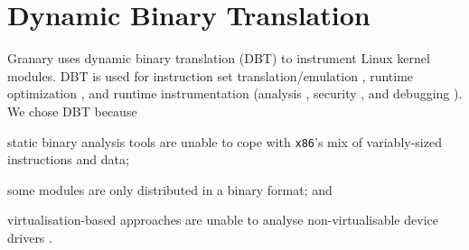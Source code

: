 \documentclass[preprint]{sigplanconf}
\newcommand{\comment}[1]{}
\begin{document}
%	

\section{Dynamic Binary Translation}\label{sec:dbt}


Granary uses dynamic binary translation (DBT) to instrument Linux kernel modules. DBT is used for instruction set translation/emulation \cite{QEMU}, runtime optimization \cite{DynamoRIOOptimisation}, and runtime instrumentation (analysis \cite{DynamoRIO}, security \cite{Vx32,NaCl}, and debugging \cite{Valgrind}). We chose DBT because \begin{inparaenum}[i)]
	\item static binary analysis tools are unable to cope with \texttt{x86}'s mix of variably-sized instructions and data; 
	\item some modules are only distributed in a binary format; and
	\item virtualisation-based approaches are unable to analyse non-virtualisable device drivers \cite{DRK}.
\end{inparaenum}
\end{document}

